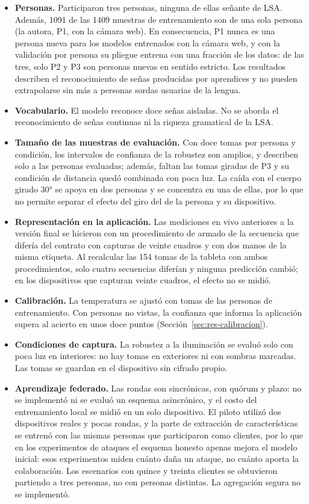 \begin{itemize}
    \item \textbf{Personas.} Participaron tres personas, ninguna de ellas señante de LSA. Además, 1091 de las 1409 muestras de entrenamiento son de una sola persona (la autora, P1, con la cámara web). En consecuencia, P1 nunca es una persona nueva para los modelos entrenados con la cámara web, y con la validación por persona su pliegue entrena con una fracción de los datos: de las tres, solo P2 y P3 son personas nuevas en sentido estricto. Los resultados describen el reconocimiento de señas producidas por aprendices y no pueden extrapolarse sin más a personas sordas usuarias de la lengua.
    \item \textbf{Vocabulario.} El modelo reconoce doce señas aisladas. No se aborda el reconocimiento de señas continuas ni la riqueza gramatical de la LSA.
    \item \textbf{Tamaño de las muestras de evaluación.} Con doce tomas por persona y condición, los intervalos de confianza de la robustez son amplios, y describen solo a las personas evaluadas; además, faltan las tomas giradas de P3 y su condición de distancia quedó combinada con poca luz. La caída con el cuerpo girado 30° se apoya en dos personas y se concentra en una de ellas, por lo que no permite separar el efecto del giro del de la persona y su dispositivo.
    \item \textbf{Representación en la aplicación.} Las mediciones en vivo anteriores a la versión final se hicieron con un procedimiento de armado de la secuencia que difería del contrato con capturas de veinte cuadros y con dos manos de la misma etiqueta. Al recalcular las 154 tomas de la tableta con ambos procedimientos, solo cuatro secuencias diferían y ninguna predicción cambió; en los dispositivos que capturan veinte cuadros, el efecto no se midió.
    \item \textbf{Calibración.} La temperatura se ajustó con tomas de las personas de entrenamiento. Con personas no vistas, la confianza que informa la aplicación supera al acierto en unos doce puntos (Sección~\ref{sec:res-calibracion}).
    \item \textbf{Condiciones de captura.} La robustez a la iluminación se evaluó solo con poca luz en interiores: no hay tomas en exteriores ni con sombras marcadas. Las tomas se guardan en el dispositivo sin cifrado propio.
    \item \textbf{Aprendizaje federado.} Las rondas son sincrónicas, con quórum y plazo: no se implementó ni se evaluó un esquema asincrónico, y el costo del entrenamiento local se midió en un solo dispositivo. El piloto utilizó dos dispositivos reales y pocas rondas, y la parte de extracción de características se entrenó con las mismas personas que participaron como clientes, por lo que en los experimentos de ataques el esquema honesto apenas mejora el modelo inicial: esos experimentos miden cuánto daña un ataque, no cuánto aporta la colaboración. Los escenarios con quince y treinta clientes se obtuvieron partiendo a tres personas, no con personas distintas. La agregación segura no se implementó.

\end{itemize}

